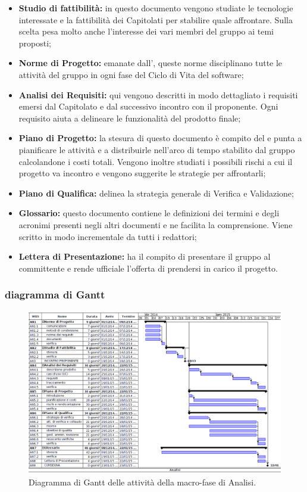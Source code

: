 \begin{itemize}
\item \textbf{Studio di fattibilità:} in questo documento vengono studiate le tecnologie interessate e la fattibilità dei Capitolati per stabilire quale affrontare. Sulla scelta pesa molto anche l'interesse dei vari membri del gruppo ai temi proposti;
\item \textbf{Norme di Progetto:} emanate dall'\ruoloAmministratore{}, queste norme disciplinano tutte le attività del gruppo in ogni fase del Ciclo di Vita del software;
\item \textbf{Analisi dei Requisiti:} qui vengono descritti in modo dettagliato i requisiti emersi dal Capitolato e dal successivo incontro con il proponente. Ogni requisito aiuta a delineare le funzionalità del prodotto finale;
\item \textbf{Piano di Progetto:} la stesura di questo documento è compito del \ruoloResponsabile{} e punta a pianificare le attività e a distribuirle nell'arco di tempo stabilito dal gruppo calcolandone i costi totali. Vengono inoltre studiati i possibili rischi a cui il progetto va incontro e vengono suggerite le strategie per affrontarli;
\item \textbf{Piano di Qualifica:} delinea la strategia generale di Verifica e Validazione;
\item \textbf{Glossario:} questo documento contiene le definizioni dei termini e degli acronimi presenti negli altri documenti e ne facilita la comprensione. Viene scritto in modo incrementale da tutti i redattori;
\item \textbf{Lettera di Presentazione:} ha il compito di presentare il gruppo al committente e rende ufficiale l'offerta di prendersi in carico il progetto.
\end{itemize}

\newpage
\subsubsection{diagramma di Gantt}

\begin{figure}[h]
\begin{center}
\includegraphics[width=\textwidth, height=\textheight, keepaspectratio]{img/analisi-gantt.png}
\caption{Diagramma di Gantt delle attività della macro-fase di Analisi.}
\end{center}
\end{figure}
\clearpage

